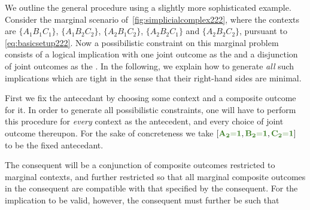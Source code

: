 %

We outline the general procedure using a slightly more sophisticated example. Consider the marginal scenario of~\cref{fig:simplicialcomplex222}, where the contexts are $\{A_1 B_1 C_1\}$, $\{A_1 B_2 C_2\}$, $\{A_2 B_1 C_2\}$, $\{A_2 B_2 C_1\}$ and $\{A_2 B_2 C_2\}$, pursuant to \cref{eq:basicsetup222}.
Now a possibilistic constraint on this marginal problem consists of a logical implication with one joint outcome as the  and a disjunction of joint outcomes as the . In the following, we explain how to generate \emph{all} such implications which are tight in the sense that their right-hand sides are minimal.

First we fix the antecedant by choosing some context and a composite outcome for it. In order to generate all possibilistic constraints, one will have to perform this procedure for
\emph{every} context as the antecedent, and every choice of joint outcome thereupon. For the sake of concreteness we take $\bracks{\mgreen{A_2 \eql 1}, \mgreen{B_2 \eql 1}, \mgreen{C_2 \eql 1}}$ to be the fixed antecedant.

The consequent will be a conjunction of composite outcomes restricted to marginal contexts, and further restricted so that all marginal composite outcomes in the consequent are compatible with that specified by the consequent. 
For the implication to be valid, however, the consequent must further be such that 

